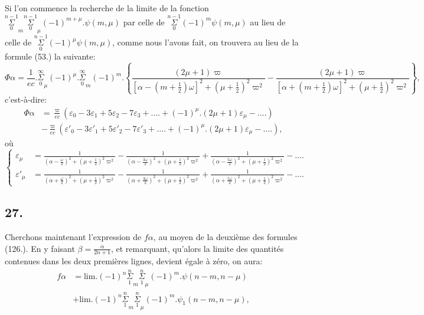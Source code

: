 \documentclass{article}
\begin{document}
Si l'on commence la recherche de la limite de la fonction $\overset{n-1}{\underset{0}{\Sigma}}_{m}\overset{n-1}{\underset{0}{\Sigma}}_{\mu}(-1)^{m+\mu}.\psi(m,\mu)$ par celle de $\overset{n-1}{\underset{0}{\Sigma}}(-1)^{m}\psi(m,\mu)$ au lieu de celle de $\overset{n-1}{\underset{0}{\Sigma}}(-1)^{\mu}\psi(m,\mu)$, comme nous l'avons fait, on trouvera au lieu de la formule (53.) la suivante:
\[ \Phi\alpha=\frac{1}{ec}.\overset{\infty}{\underset{0}{\Sigma}}_{\mu}(-1)^{\mu}.\overset{\infty}{\underset{0}{\Sigma}}_{m}(-1)^{m}.\left\{\frac{(2\mu+1)\varpi}{[\alpha-(m+\tfrac{1}{2})\omega]^{2}+(\mu+\tfrac{1}{2})^{2}\varpi^{2}}-\frac{(2\mu+1)\varpi}{[\alpha+(m+\tfrac{1}{2})\omega]^{2}+(\mu+\tfrac{1}{2})^{2}\varpi^{2}}\right\}, \tag{156.} \]
c'est-à-dire:
\[ \begin{aligned}\Phi\alpha&=\frac{\varpi}{ec}(\varepsilon_{0}-3\varepsilon_{1}+5\varepsilon_{2}-7\varepsilon_{3}+....+(-1)^{\mu}.(2\mu+1)\varepsilon_{\mu}-....)\\ &-\frac{\varpi}{ec}(\varepsilon'_{0}-3\varepsilon'_{1}+5\varepsilon'_{2}-7\varepsilon'_{3}+....+(-1)^{\mu}.(2\mu+1)\varepsilon_{\mu}-....),\end{aligned} \tag{157.} \]
où
\[ \left\{\begin{aligned}\varepsilon_{\mu}&=\frac{1}{\left(\alpha-\frac{\omega}{2}\right)^{2}+(\mu+\tfrac{1}{2})^{2}\varpi^{2}}-\frac{1}{\left(\alpha-\frac{3\omega}{2}\right)^{2}+(\mu+\tfrac{1}{2})^{2}\varpi^{2}}+\frac{1}{\left(\alpha-\frac{5\omega}{2}\right)^{2}+(\mu+\tfrac{1}{2})^{2}\varpi^{2}}-....\\ \varepsilon'_{\mu}&=\frac{1}{\left(\alpha+\frac{\omega}{2}\right)^{2}+(\mu+\tfrac{1}{2})^{2}\varpi^{2}}-\frac{1}{\left(\alpha+\frac{3\omega}{2}\right)^{2}+(\mu+\tfrac{1}{2})^{2}\varpi^{2}}+\frac{1}{\left(\alpha+\frac{5\omega}{2}\right)^{2}+(\mu+\tfrac{1}{2})^{2}\varpi^{2}}-....\end{aligned}\right. \tag{158.} \]

\subsection*{27.}

Cherchons maintenant l'expression de $f\alpha$, au moyen de la deuxième des formules (126.). En y faisant $\beta=\frac{\alpha}{2n+1}$, et remarquant, qu'alors la limite des quantités contenues dans les deux premières lignes, devient égale à zéro, on aura:
\[ \begin{aligned}f\alpha&=\text{lim.}(-1)^{n}\overset{n}{\underset{1}{\Sigma}}_{m}\overset{n}{\underset{1}{\Sigma}}_{\mu}(-1)^{m}.\psi(n-m,n-\mu)\\ &+\text{lim.}(-1)^{n}\overset{n}{\underset{1}{\Sigma}}_{m}\overset{n}{\underset{1}{\Sigma}}_{\mu}(-1)^{m}.\psi_{1}(n-m,n-\mu),\end{aligned} \tag{159.} \]
\end{document}
